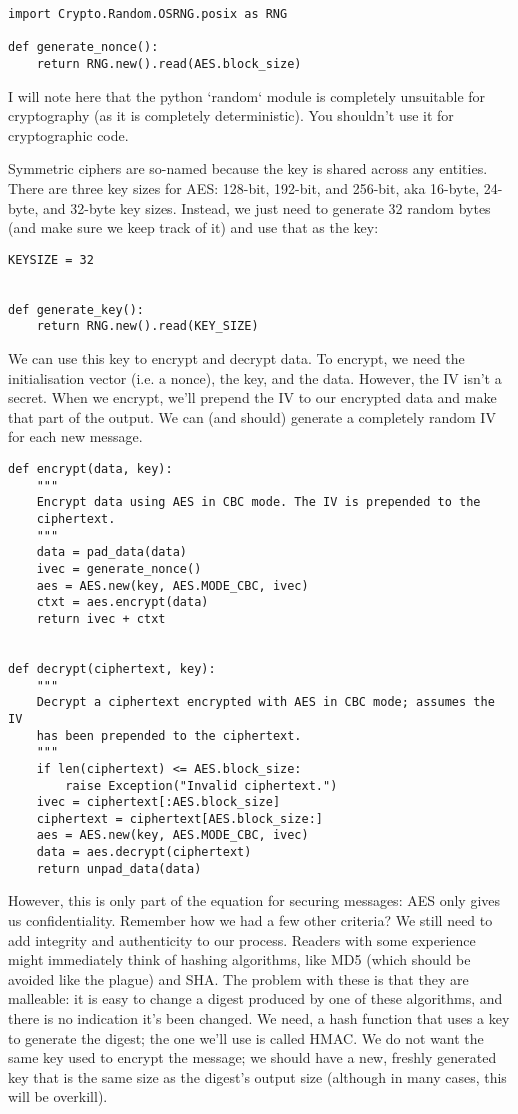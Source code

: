 \documentclass[letterpaper,10pt]{article}
\begin{document}
\begin{verbatim}
import Crypto.Random.OSRNG.posix as RNG

def generate_nonce():
    return RNG.new().read(AES.block_size)
\end{verbatim}

I will note here that the python `random` module is completely
unsuitable for cryptography (as it is completely deterministic). You
shouldn’t use it for cryptographic code.

Symmetric ciphers are so-named because the key is shared across any
entities.  There are three key sizes for AES: 128-bit, 192-bit, and
256-bit, aka 16-byte, 24-byte, and 32-byte key sizes. Instead, we just
need to generate 32 random bytes (and make sure we keep track of it)
and use that as the key:

\begin{verbatim}
KEYSIZE = 32


def generate_key():
    return RNG.new().read(KEY_SIZE)
\end{verbatim}

We can use this key to encrypt and decrypt data. To encrypt, we
need the initialisation vector (i.e. a nonce), the key, and the
data. However, the IV isn't a secret. When we encrypt, we'll prepend
the IV to our encrypted data and make that part of the output. We
can (and should) generate a completely random IV for each new
message.

\begin{verbatim}
def encrypt(data, key):
    """
    Encrypt data using AES in CBC mode. The IV is prepended to the
    ciphertext.
    """
    data = pad_data(data)
    ivec = generate_nonce()
    aes = AES.new(key, AES.MODE_CBC, ivec)
    ctxt = aes.encrypt(data)
    return ivec + ctxt


def decrypt(ciphertext, key):
    """
    Decrypt a ciphertext encrypted with AES in CBC mode; assumes the IV
    has been prepended to the ciphertext.
    """
    if len(ciphertext) <= AES.block_size:
        raise Exception("Invalid ciphertext.")
    ivec = ciphertext[:AES.block_size]
    ciphertext = ciphertext[AES.block_size:]
    aes = AES.new(key, AES.MODE_CBC, ivec)
    data = aes.decrypt(ciphertext)
    return unpad_data(data)
\end{verbatim}

However, this is only part of the equation for securing messages:
AES only gives us confidentiality. Remember how we had a few other
criteria? We still need to add integrity and authenticity to our
process. Readers with some experience might immediately think of
hashing algorithms, like MD5 (which should be avoided like the
plague) and SHA. The problem with these is that they are malleable:
it is easy to change a digest produced by one of these algorithms,
and there is no indication it's been changed. We need, a hash
function that uses a key to generate the digest; the one we'll use
is called HMAC. We do not want the same key used to encrypt the
message; we should have a new, freshly generated key that is the
same size as the digest's output size (although in many cases, this
will be overkill).
\end{document}
